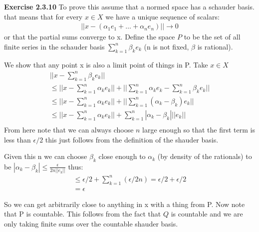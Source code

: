 \documentclass[12pt]{article}
\newenvironment{exercise}[1]{\vspace{.1in}\noindent\textbf{Exercise #1 \hspace{.05em}}}{}
\theoremstyle{definition}
\theoremstyle{remark}
\begin{document}
\begin{exercise}{2.3.10}
	To prove this assume that a normed space has a schauder basis. that means that for every $x\in X$ we have a unique sequence of scalars:
	\begin{align}
		||x-(\alpha_1e_1+\dots+\alpha_ne_n)||\rightarrow 0
	\end{align}
	or that the partial sums converge to x. Define the space $P$ to be the set of all finite series in the schauder basis $\sum_{k=1}^n\beta_ke_k$ (n is not fixed, $\beta$ is rational).

	We show that any point x is also a limit point of things in P. Take $x\in X$
	\begin{align}
		||x-\sum_{k=1}^n\beta_ke_k||                                                          \\
		\leq ||x-\sum_{k=1}^n\alpha_ke_k||+||\sum_{k=1}^n\alpha_ke_k-\sum_{k=1}^n\beta_ke_k|| \\
		\leq ||x-\sum_{k=1}^n\alpha_ke_k||+||\sum_{k=1}^n(\alpha_k-\beta_k)e_k||              \\
		\leq ||x-\sum_{k=1}^n\alpha_ke_k||+\sum_{k=1}^n|\alpha_k-\beta_k|||e_k||              \\
	\end{align}
	From here note that we can always choose $n$ large enough so that the first term is less than $\epsilon/2$ this just follows from the definition of the shauder basis.

	Given this n we can choose $\beta_k$ close enough to $\alpha_k$ (by density of the rationals) to be $|\alpha_k-\beta_k|\leq \frac{\epsilon}{2n||e_k||}$ thus:
	\begin{align}
		\leq \epsilon/2 + \sum\limits_{k=1}^{n}\left(\epsilon/2n\right)
		= \epsilon/2 + \epsilon/2 \\
		=\epsilon
	\end{align}

	So we can get arbitrarily close to anything in x with a thing from P. Now note that P is countable. This follows from the fact that $Q$ is countable and we are only taking finite sums over the countable shauder basis.

\end{exercise}
\end{document}
